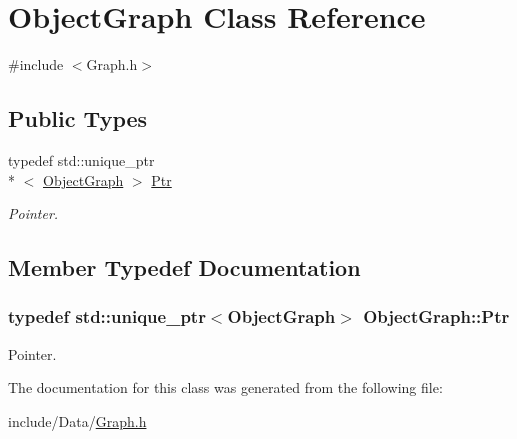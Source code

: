 \hypertarget{class_object_graph}{\section{Object\-Graph Class Reference}
\label{class_object_graph}
}


{\ttfamily \#include $<$Graph.\-h$>$}

\subsection*{Public Types}
\begin{DoxyCompactItemize}
\item 
typedef std\-::unique\-\_\-ptr\\*
$<$ \hyperlink{class_object_graph}{Object\-Graph} $>$ \hyperlink{class_object_graph_ad2359e9fe0859848c13b72155fba324f}{Ptr}
\begin{DoxyCompactList}\small\item\em Pointer. \end{DoxyCompactList}\end{DoxyCompactItemize}


\subsection{Member Typedef Documentation}
\hypertarget{class_object_graph_ad2359e9fe0859848c13b72155fba324f}{
\subsubsection[{Ptr}]{\setlength{\rightskip}{0pt plus 5cm}typedef std\-::unique\-\_\-ptr$<${\bf Object\-Graph}$>$ {\bf Object\-Graph\-::\-Ptr}}}\label{class_object_graph_ad2359e9fe0859848c13b72155fba324f}


Pointer. 



The documentation for this class was generated from the following file\-:\begin{DoxyCompactItemize}
\item 
include/\-Data/\hyperlink{_graph_8h}{Graph.\-h}\end{DoxyCompactItemize}
